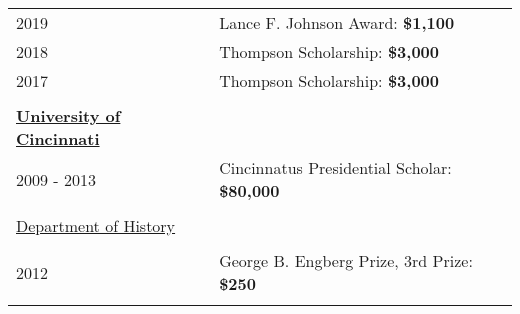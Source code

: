 \documentclass[margin,line,pifont,palatino,courier]{res}
\newenvironment{list1}{
  \begin{list}{\ding{113}}{%
      \setlength{\itemsep}{0in}
      \setlength{\parsep}{0in} \setlength{\parskip}{0in}
      \setlength{\topsep}{0in} \setlength{\partopsep}{0in}
      \setlength{\leftmargin}{0.17in}}}{\end{list}}
\begin{document}
\begin{resume}
\begin{tabular}{ll}
  2019       & Lance F. Johnson Award: \bf{\$1,100}\\
  2018       & Thompson Scholarship: \bf{\$3,000}\\
  2017       & Thompson Scholarship: \bf{\$3,000}\\
  \\
  \textbf{\underline{University of Cincinnati}}&\\
  2009 - 2013 & Cincinnatus Presidential Scholar: \bf{\$80,000}\\
  \\
  \underline{Department of History}&\\
  \\
  2012       & George B. Engberg Prize, 3rd Prize: \bf{\$250}  \\
  \\
\end{tabular}









\end{resume}
\end{document}
